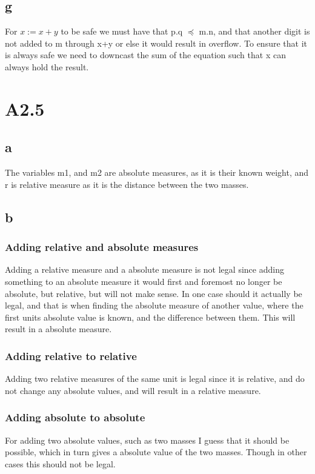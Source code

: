 \documentclass[10pt,a4paper]{article}      %
\begin{document}
\subsection*{g}
For $x:= x+y$ to be safe we must have that p.q $\preceq$ m.n, and that another digit is not added to m through x+y or else it would result in overflow. To ensure that it is always safe we need to downcast the sum of the equation such that x can always hold the result.

\section*{A2.5}
\subsection*{a}
The variables m1, and m2 are absolute measures, as it is their known weight, and r is relative measure as it is the distance between the two masses.

\subsection*{b}
\subsubsection*{Adding relative and absolute measures}
Adding a relative measure and a absolute measure is not legal since adding something to an absolute measure it would first and foremost no longer be absolute, but relative, but will not make sense. In one case should it actually be legal, and that is when finding the absolute measure of another value, where the first units absolute value is known, and the difference between them. This will result in a absolute measure.

\subsubsection*{Adding relative to relative}
Adding two relative measures of the same unit is legal since it is relative, and do not change any absolute values, and will result in a relative measure.

\subsubsection*{Adding absolute to absolute}
For adding two absolute values, such as two masses I guess that it should be possible, which in turn gives a absolute value of the two masses. Though in other cases this should not be legal.
\end{document}
